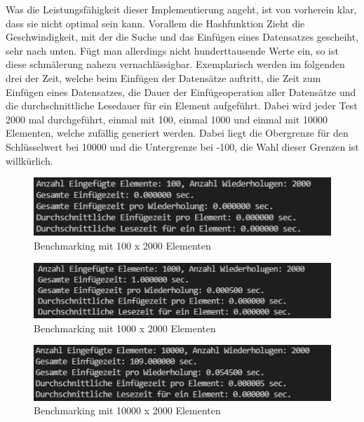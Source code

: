 \documentclass[11pt,a4paper]{article}
\begin{document}
Was die Leistungsfähigkeit dieser Implementierung angeht, ist von vorherein klar, dass sie nicht optimal sein kann. Vorallem die Hashfunktion 
Zieht die Geschwindigkeit, mit der die Suche und das Einfügen eines Datensatzes gescheiht, sehr nach unten. Fügt man allerdings nicht hunderttausende 
Werte ein, so ist diese schmälerung nahezu vernachlässigbar. Exemplarisch werden im folgenden drei der Zeit, welche beim Einfügen der Datensätze auftritt, die Zeit zum Einfügen eines Datensatzes, die Dauer der Einfügeoperation aller Datensätze und die durchschnittliche 
Lesedauer für ein Element aufgeführt. Dabei wird jeder Test 2000 mal durchgeführt, einmal mit 100, einmal 1000 und einmal mit 10000 Elementen, welche zufällig generiert werden.
Dabei liegt die Obergrenze für den Schlüsselwert bei 10000 und die Untergrenze bei -100, die Wahl dieser Grenzen ist willkürlich.\\
\begin{figure}[h]
    \centering
    \includegraphics[scale=0.5]{Bilder/100e.PNG}
    \caption[Bild 5:]{Benchmarking mit 100 x 2000 Elementen}

\end{figure}
\begin{figure}[h]
    \centering

    \includegraphics[scale=0.5]{Bilder/1000e.PNG}
    \caption[Bild 6:]{Benchmarking mit 1000 x 2000 Elementen}

\end{figure}
\begin{figure}[h]
    \centering
    \includegraphics[scale=0.5]{Bilder/10000e.PNG}
    \caption[Bild 7:]{Benchmarking mit 10000 x 2000 Elementen}
\end{figure}
\linebreak
\end{document}
